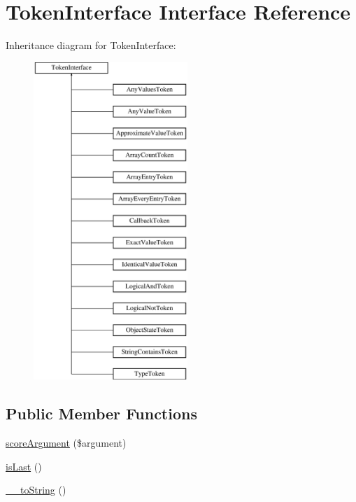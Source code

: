 \hypertarget{interface_prophecy_1_1_argument_1_1_token_1_1_token_interface}{}\section{Token\+Interface Interface Reference}
\label{interface_prophecy_1_1_argument_1_1_token_1_1_token_interface}
Inheritance diagram for Token\+Interface\+:\begin{figure}[H]
\begin{center}
\leavevmode
\includegraphics[height=12.000000cm]{interface_prophecy_1_1_argument_1_1_token_1_1_token_interface}
\end{center}
\end{figure}
\subsection*{Public Member Functions}
\begin{DoxyCompactItemize}
\item 
\mbox{\hyperlink{interface_prophecy_1_1_argument_1_1_token_1_1_token_interface_a8d5bf47ab6eaa935458d5ad160e52822}{score\+Argument}} (\$argument)
\item 
\mbox{\hyperlink{interface_prophecy_1_1_argument_1_1_token_1_1_token_interface_ac72b8349b1340887fc1af30eca2b951c}{is\+Last}} ()
\item 
\mbox{\hyperlink{interface_prophecy_1_1_argument_1_1_token_1_1_token_interface_a7516ca30af0db3cdbf9a7739b48ce91d}{\+\_\+\+\_\+to\+String}} ()
\end{DoxyCompactItemize}


